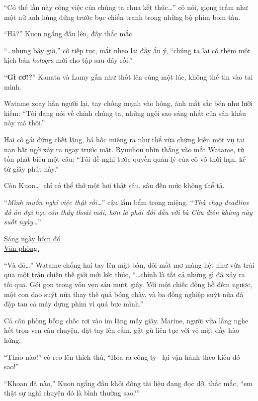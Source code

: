 \documentclass[../main.tex]{subfiles}
\begin{document}
``Có thể lần này công việc của chúng ta chưa kết thúc\dots'' cô nói, giọng trầm như một nữ anh hùng đứng trước bục chiến tranh trong những bộ phim bom tấn.

``Hả?'' Kuon ngẩng đầu lên, đầy thắc mắc.

``\dots nhưng bây giờ,'' cô tiếp tục, mắt nheo lại đầy ẩn ý, ``chúng ta lại có thêm một kịch bản \textit{hologra} mới cho tập sau đây rồi.''

``\textbf{Gì cơ!?}'' Kanata và Lamy gần như thốt lên cùng một lúc, không thể tin vào tai mình.

Watame xoay hẳn người lại, tay chống mạnh vào hông, ánh mắt sắc bén như lưỡi kiếm: ``Tôi đang nói về chính chúng ta, những ngôi sao sáng nhất của sân khấu này mà thôi.''

Hai cô gái đứng chết lặng, há hốc miệng ra như thể vừa chứng kiến một vụ tai nạn bất ngờ xảy ra ngay trước mặt. Ryuuhou nhìn thẳng vào mắt Watame, từ tốn phát biểu một câu: ``Tôi đề nghị tước quyền quản lý của cô vô thời hạn, kể từ giây phút này.''

Còn Kuon\dots\ chỉ có thể thở một hơi thật sâu, sâu đến mức không thể tả.

``\textit{Mình muốn nghỉ việc thật rồi\dots}'' cậu lẩm bẩm trong miệng. ``\textit{Thà chạy deadline đồ án đại học còn thấy thoải mái, hơn là phải đối đầu với bà Cừu điên khùng này suốt ngày\dots}''
\omk

\begin{center}
  \uline{Sáng ngày hôm đó\\Văn phòng.}
\end{center}

``Và đó\dots'' Watame chống hai tay lên mặt bàn, đôi mắt mơ màng hệt như vừa trải qua một trận chiến thế giới mới kết thúc, ``\dots chính là tất cả những gì đã xảy ra tối qua. Gói gọn trong vỏn vẹn sáu mươi giây. Với một chiếc đồng hồ đếm ngược, một con dao suýt nữa thay thế quả bóng chày, và ba đồng nghiệp suýt nữa đã đập tan cả máy dựng phim vì quá bực mình.''

Cả căn phòng bỗng chốc rơi vào im lặng mấy giây. Marine, người vừa lắng nghe hết trọn vẹn câu chuyện, đặt tay lên cằm, gật gù liên tục với vẻ mặt đầy hào hứng.

``Thảo nào!'' cô reo lên thích thú, ``Hóa ra công ty \hll\ lại vận hành theo kiểu đó sao!''

``Khoan đã nào,'' Kuon ngẩng đầu khỏi đống tài liệu đang đọc dở, thắc mắc, ``em thật sự nghĩ chuyện đó là bình thường sao?''
\end{document}
